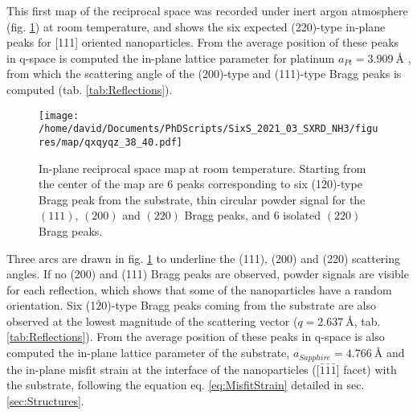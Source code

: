 This first map of the reciprocal space was recorded under inert argon atmosphere (fig. \ref{fig:QxQyMap}) at room temperature, and shows the six expected (220)-type in-plane peaks for [111] oriented nanoparticles.
From the average position of these peaks in q-space is computed the in-plane lattice parameter for platinum $a_{Pt}=\qty{3.909}{\angstrom}$
, from which the scattering angle of the (200)-type and (111)-type Bragg peaks is computed (tab. \ref{tab:Reflections}).

\begin{figure}[!htb]
    \centering
    \texttt{[image: /home/david/Documents/PhDScripts/SixS\_2021\_03\_SXRD\_NH3/figures/map/qxqyqz\_38\_40.pdf]}
    \caption{
        In-plane reciprocal space map at room temperature.
        Starting from the center of the map are 6 peaks corresponding to six (1$\bar{2}$0)-type Bragg peak from the substrate, thin circular powder signal for the $(111)$, $(200)$ and $(220)$ Bragg peaks, and 6 isolated $(220)$ Bragg peaks.
    }
    \label{fig:QxQyMap}
\end{figure}

Three arcs are drawn in fig. \ref{fig:QxQyMap} to underline the (111), (200) and (220) scattering angles.
If no (200) and (111) Bragg peaks are observed, powder signals are visible for each reflection, which shows that some of the nanoparticles have a random orientation.
Six (1$\bar{2}$0)-type Bragg peaks coming from the  substrate are also observed at the lowest magnitude of the scattering vector ($q = \qty{2.637}{\angstrom}$, tab. \ref{tab:Reflections}).
From the average position of these peaks in q-space is also computed the in-plane lattice parameter of the substrate, $a_{Sapphire}=\qty{4.766}{\angstrom}$ and the in-plane misfit strain at the interface of the nanoparticles ([$\bar{1}\bar{1}\bar{1}$] facet) with the substrate, following the equation eq. \ref{eq:MisfitStrain} detailed in sec. \ref{sec:Structures}.

